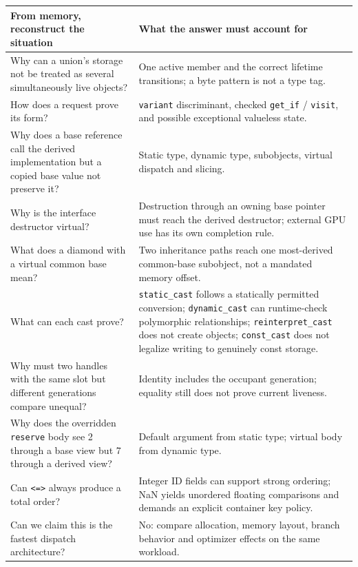 {\def\LTcaptype{none} %
\begin{longtable}[]{@{}
  >{\raggedright\arraybackslash}p{}
  >{\raggedright\arraybackslash}p{}@{}}
\toprule\noalign{}
\begin{minipage}[b]{\linewidth}\raggedright
From memory, reconstruct the situation
\end{minipage} & \begin{minipage}[b]{\linewidth}\raggedright
What the answer must account for
\end{minipage} \\
\midrule\noalign{}
\endhead
\bottomrule\noalign{}
\endlastfoot
Why can a union's storage not be treated as several simultaneously live objects? & One active member and the correct lifetime transitions; a byte pattern is not a type tag. \\
How does a request prove its form? & \texttt{variant} discriminant, checked \texttt{get\_if} / \texttt{visit}, and possible exceptional valueless state. \\
Why does a base reference call the derived implementation but a copied base value not preserve it? & Static type, dynamic type, subobjects, virtual dispatch and slicing. \\
Why is the interface destructor virtual? & Destruction through an owning base pointer must reach the derived destructor; external GPU use has its own completion rule. \\
What does a diamond with a virtual common base mean? & Two inheritance paths reach one most-derived common-base subobject, not a mandated memory offset. \\
What can each cast prove? & \texttt{static\_cast} follows a statically permitted conversion; \texttt{dynamic\_cast} can runtime-check polymorphic relationships; \texttt{reinterpret\_cast} does not create objects; \texttt{const\_cast} does not legalize writing to genuinely const storage. \\
Why must two handles with the same slot but different generations compare unequal? & Identity includes the occupant generation; equality still does not prove current liveness. \\
Why does the overridden \texttt{reserve} body see 2 through a base view but 7 through a derived view? & Default argument from static type; virtual body from dynamic type. \\
Can \texttt{\textless{}=\textgreater{}} always produce a total order? & Integer ID fields can support strong ordering; NaN yields unordered floating comparisons and demands an explicit container key policy. \\
Can we claim this is the fastest dispatch architecture? & No: compare allocation, memory layout, branch behavior and optimizer effects on the same workload. \\
\end{longtable}
}

